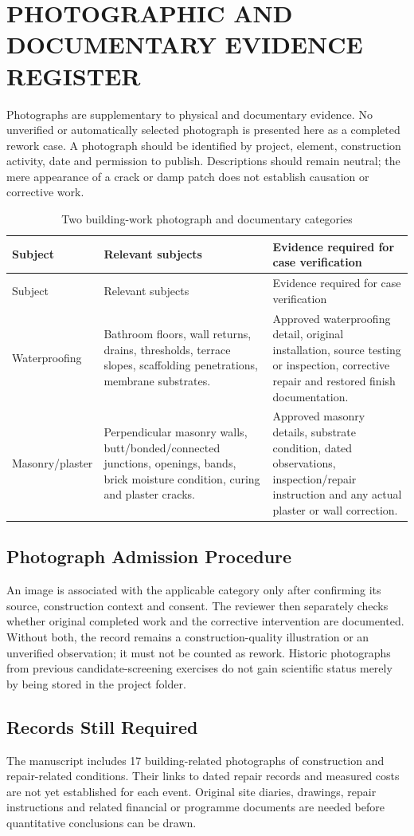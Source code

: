 \chapter{PHOTOGRAPHIC AND DOCUMENTARY EVIDENCE REGISTER}
\label{app:evidenceregister}
Photographs are supplementary to physical and documentary evidence. No unverified or automatically selected photograph is presented here as a completed rework case. A photograph should be identified by project, element, construction activity, date and permission to publish. Descriptions should remain neutral; the mere appearance of a crack or damp patch does not establish causation or corrective work.
\begin{longtable}{@{}L{0.24\textwidth}L{0.29\textwidth}L{0.35\textwidth}@{}}
\caption{Two building-work photograph and documentary categories}\label{tab:photoregister}\\
\toprule Subject & Relevant subjects & Evidence required for case verification\\ \midrule\endfirsthead
\toprule Subject & Relevant subjects & Evidence required for case verification\\ \midrule\endhead
Waterproofing & Bathroom floors, wall returns, drains, thresholds, terrace slopes, scaffolding penetrations, membrane substrates. & Approved waterproofing detail, original installation, source testing or inspection, corrective repair and restored finish documentation.\\
Masonry/plaster & Perpendicular masonry walls, butt/bonded/connected junctions, openings, bands, brick moisture condition, curing and plaster cracks. & Approved masonry details, substrate condition, dated observations, inspection/repair instruction and any actual plaster or wall correction.\\
\bottomrule
\end{longtable}

\section{Photograph Admission Procedure}
An image is associated with the applicable category only after confirming its source, construction context and consent. The reviewer then separately checks whether original completed work and the corrective intervention are documented. Without both, the record remains a construction-quality illustration or an unverified observation; it must not be counted as rework. Historic photographs from previous candidate-screening exercises do not gain scientific status merely by being stored in the project folder.

\section{Records Still Required}
The manuscript includes 17 building-related photographs of construction and repair-related conditions. Their links to dated repair records and measured costs are not yet established for each event. Original site diaries, drawings, repair instructions and related financial or programme documents are needed before quantitative conclusions can be drawn.
